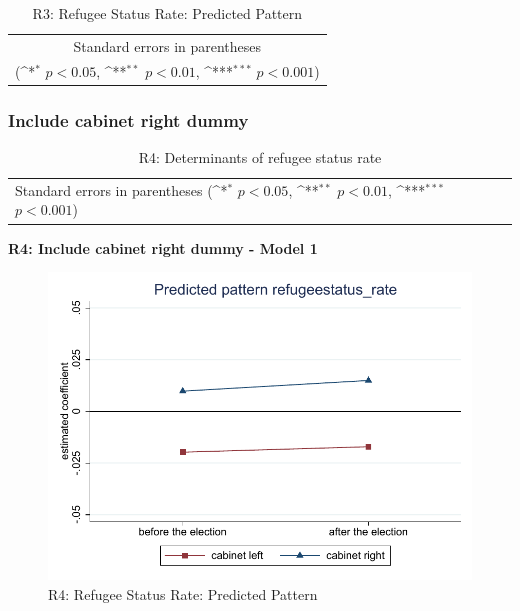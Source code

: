 \documentclass[10pt,a4paper]{scrartcl}
\begin{document}
\begin{table}[!ht]\centering
	\footnotesize
	\renewcommand{\arraystretch}{1.2}
	\def\sym#1{\ifmmode^{#1}\else\(^{#1}\)\fi}
	\caption{R3: Refugee Status Rate: Predicted Pattern}
	\begin{tabular}{l*{2}{c}}
		\hline\hline
		
		\hline\hline
		\multicolumn{3}{c}{\footnotesize Standard errors in parentheses} \\
		\multicolumn{3}{c}{\footnotesize (\sym{*} \(p<0.05\), \sym{**} \(p<0.01\), \sym{***} \(p<0.001\))} \\
	\end{tabular}
\end{table}




\clearpage
\FloatBarrier
\subsubsection{Include cabinet right dummy}
\begin{table}[!ht]\centering
	\renewcommand{\arraystretch}{1.25}
	\small
	\def\sym#1{\ifmmode^{#1}\else\(^{#1}\)\fi}
	\caption{R4: Determinants of refugee status rate}
	\begin{tabular}{l*{3}{c}}
		\hline\hline
		
		\hline\hline
		\multicolumn{4}{l}{\footnotesize Standard errors in parentheses (\sym{*} \(p<0.05\), \sym{**} \(p<0.01\), \sym{***} \(p<0.001\))}\\
	\end{tabular}
\end{table}

\clearpage
\textbf{R4: Include cabinet right dummy - Model 1}
\begin{figure}[!ht]
	\centering
	\includegraphics[width=1\textwidth]{figures_edited/refugeestatus_rate_graph1_R4.pdf}
	\caption{R4: Refugee Status Rate: Predicted Pattern}
\end{figure}
\end{document}
